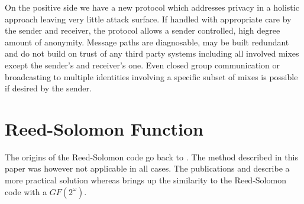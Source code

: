 \documentclass[9pt,journal,compsoc]{IEEEtran}
\begin{document}
On the positive side we have a new protocol which addresses privacy in a holistic approach leaving very little attack surface. If handled with appropriate care by the sender and receiver, the protocol allows a sender controlled, high degree amount of anonymity. Message paths are diagnosable, may be built redundant and do not build on trust of any third party systems including all involved mixes except the sender's and receiver's one. Even closed group communication or broadcasting to multiple identities involving a specific subset of mixes is possible if desired by the sender.


%


\appendices

\section{Reed-Solomon Function\label{sec:reedSolomon}}
The origins of the Reed-Solomon code go back to \cite{reed1960polynomial}. The method described in this paper was however not applicable in all cases. The publications \cite{karnin1983secret} and \cite{Rabin:1989:EDI:62044.62050} describe a more practical solution whereas \cite{preparata1989holographic} brings up the similarity to the Reed-Solomon code with a $GF(2^\omega)$. 
\end{document}
